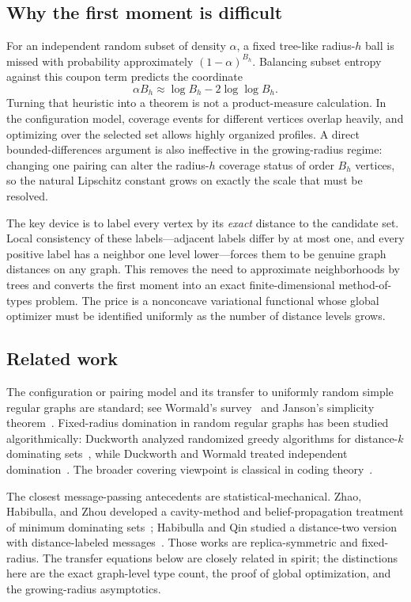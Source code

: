 \documentclass[11pt]{amsart}
\theoremstyle{definition}
\begin{document}
\subsection{Why the first moment is difficult}
For an independent random subset of density $\alpha$, a fixed tree-like radius-$h$ ball is missed with probability approximately $(1-\alpha)^{B_h}$.  Balancing subset entropy against this coupon term predicts the coordinate
\[
 \alpha B_h\approx \log B_h-2\log\log B_h.
\]
Turning that heuristic into a theorem is not a product-measure calculation.  In the configuration model, coverage events for different vertices overlap heavily, and optimizing over the selected set allows highly organized profiles.  A direct bounded-differences argument is also ineffective in the growing-radius regime: changing one pairing can alter the radius-$h$ coverage status of order $B_h$ vertices, so the natural Lipschitz constant grows on exactly the scale that must be resolved.

The key device is to label every vertex by its \emph{exact} distance to the candidate set.  Local consistency of these labels---adjacent labels differ by at most one, and every positive label has a neighbor one level lower---forces them to be genuine graph distances on any graph.  This removes the need to approximate neighborhoods by trees and converts the first moment into an exact finite-dimensional method-of-types problem.  The price is a nonconcave variational functional whose global optimizer must be identified uniformly as the number of distance levels grows.

\subsection{Related work}
The configuration or pairing model and its transfer to uniformly random simple regular graphs are standard; see Wormald's survey~\cite{Wormald1999} and Janson's simplicity theorem~\cite{Janson2009}.  Fixed-radius domination in random regular graphs has been studied algorithmically: Duckworth analyzed randomized greedy algorithms for distance-$k$ dominating sets~\cite{Duckworth2005}, while Duckworth and Wormald treated independent domination~\cite{DuckworthWormald2006}.  The broader covering viewpoint is classical in coding theory~\cite{CohenHonkalaLitsynLobstein1997}.

The closest message-passing antecedents are statistical-mechanical.  Zhao, Habibulla, and Zhou developed a cavity-method and belief-propagation treatment of minimum dominating sets~\cite{ZhaoHabibullaZhou2015}; Habibulla and Qin studied a distance-two version with distance-labeled messages~\cite{HabibullaQin2019}.  Those works are replica-symmetric and fixed-radius.  The transfer equations below are closely related in spirit; the distinctions here are the exact graph-level type count, the proof of global optimization, and the growing-radius asymptotics.
\end{document}
